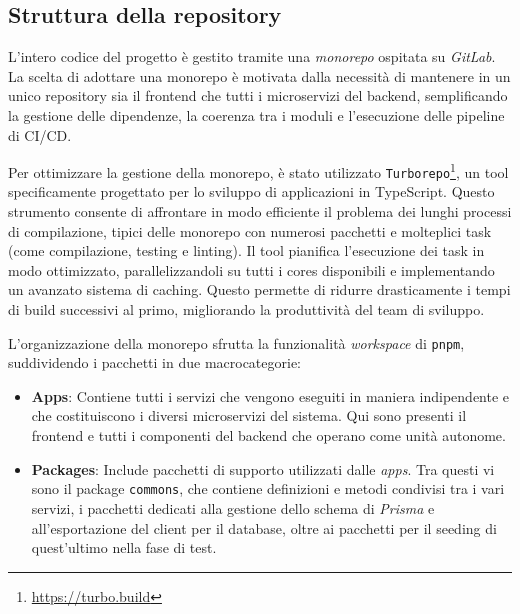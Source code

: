 \subsection{Struttura della repository}
L'intero codice del progetto è gestito tramite una \textit{monorepo} ospitata su \textit{GitLab}. La scelta di adottare una monorepo è motivata dalla necessità di mantenere in un unico repository sia il frontend che tutti i microservizi del backend, semplificando la gestione delle dipendenze, la coerenza tra i moduli e l'esecuzione delle pipeline di CI/CD.

Per ottimizzare la gestione della monorepo, è stato utilizzato \texttt{Turborepo}\footnote{\url{https://turbo.build}}, un tool specificamente progettato per lo sviluppo di applicazioni in TypeScript. Questo strumento consente di affrontare in modo efficiente il problema dei lunghi processi di compilazione, tipici delle monorepo con numerosi pacchetti e molteplici task (come compilazione, testing e linting). Il tool pianifica l'esecuzione dei task in modo ottimizzato, parallelizzandoli su tutti i cores disponibili e implementando un avanzato sistema di caching. Questo permette di ridurre drasticamente i tempi di build successivi al primo, migliorando la produttività del team di sviluppo.

L'organizzazione della monorepo sfrutta la funzionalità \textit{workspace} di \texttt{pnpm}, suddividendo i pacchetti in due macrocategorie:
\begin{itemize}
  \item \textbf{Apps}: Contiene tutti i servizi che vengono eseguiti in maniera indipendente e che costituiscono i diversi microservizi del sistema. Qui sono presenti il frontend e tutti i componenti del backend che operano come unità autonome.
  \item \textbf{Packages}: Include pacchetti di supporto utilizzati dalle \textit{apps}. Tra questi vi sono il package \texttt{commons}, che contiene definizioni e metodi condivisi tra i vari servizi, i pacchetti dedicati alla gestione dello schema di \textit{Prisma} e all'esportazione del client per il database, oltre ai pacchetti per il seeding di quest'ultimo nella fase di test.
\end{itemize}

